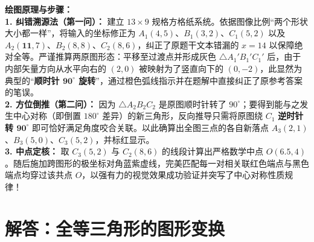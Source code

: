 \begin{center}
\end{center}

\vspace{0.4cm}
{\small\color{blue!70!black}
\textbf{绘图原理与步骤：}\\
\textbf{1. 纠错溯源法（第一问）：} 建立 $13 \times 9$ 规格方格纸系统。依据图像比例“两个形状大小都一样”，将输入的坐标修正为 $A_1(4,5)$、$B_1(3,2)$、$C_1(5,2)$ 以及 $A_2(\mathbf{11},7)$、$B_2(8,8)$、$C_2(8,6)$，纠正了原题干文本错漏的 $x=14$ 以保障绝对全等。严谨推算两原图形态：平移至过渡点并形成灰色 $\triangle A_1'B_1'C_1'$ 后，由于内部矢量方向从水平向右的 $(2,0)$ 被映射为了竖直向下的 $(0,-2)$，此显然为典型的“\textbf{顺时针 $\mathbf{90^\circ}$ 旋转}”，通过橙色弧线指示并在题解中直接纠正了原参考答案的笔误。\\
\textbf{2. 方位倒推（第二问）：} 因为 $\triangle A_2B_2C_2$ 是原图顺时针转了 $90^\circ$；要得到能与之发生中心对称（即倒置 $180^\circ$ 差异）的新三角形，反向推导只需将原图绕 $C_1$ \textbf{逆时针转 $\mathbf{90^\circ}$} 即可恰好满足角度咬合关联。以此确算出全图三点的各自新落点 $A_3(2,1)$、$B_3(5,0)$、$C_3(5,2)$，并标红显示。\\
\textbf{3. 中点定核：} 取 $C_3(5,2)$ 与 $C_2(8,6)$ 的线段计算出严格数学中点 $O(6.5,4)$。随后施加跨图形的极坐标对角蓝紫虚线，完美匹配每一对相关联红色端点与黑色端点均穿过该共点 $O$，以强有力的视觉效果成功验证并突写了中心对称性质规律！
}

\newpage



\newpage

\section{解答：全等三角形的图形变换}

